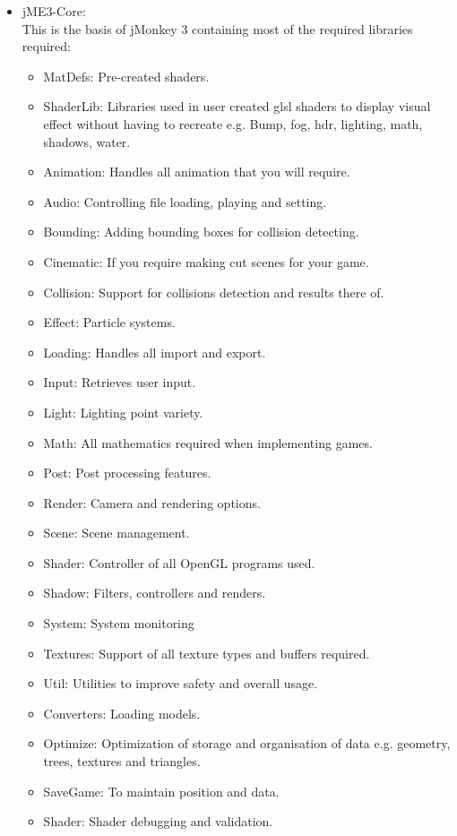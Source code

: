 \documentclass[letterpaper]{article}
\begin{document}
\begin{itemize}
				\item jME3-Core: \\
					This is the basis of jMonkey 3 containing most of the required libraries required:
					\begin{itemize}
						\item MatDefs: Pre-created shaders.
						\item ShaderLib: Libraries used in user created glsl shaders to display visual effect without having to recreate e.g. Bump, fog, hdr, lighting, math, shadows, water.
						\item Animation: Handles all animation that you will require.
						\item Audio: Controlling file loading, playing and setting.
						\item Bounding: Adding bounding boxes for collision detecting.
						\item Cinematic: If you require making cut scenes for your game.
						\item Collision: Support for collisions detection and results there of.
						\item Effect: Particle systems.
						\item Loading: Handles all import and export.
						\item Input: Retrieves user input.
						\item Light: Lighting point variety.
						\item Math: All mathematics required when implementing games.
						\item Post: Post processing features.
						\item Render: Camera and rendering options.
						\item Scene: Scene management.
						\item Shader: Controller of all OpenGL programs used.
						\item Shadow: Filters, controllers and renders.
						\item System: System monitoring 
						\item Textures: Support of all texture types and buffers required.
						\item Util: Utilities to improve safety and overall usage.
						\item Converters: Loading models.
						\item Optimize: Optimization of storage and organisation of data e.g. geometry, trees, textures and triangles.
						\item SaveGame: To maintain position and data.
						\item Shader: Shader debugging and validation.
					\end{itemize}
				

\end{itemize}
\end{document}
